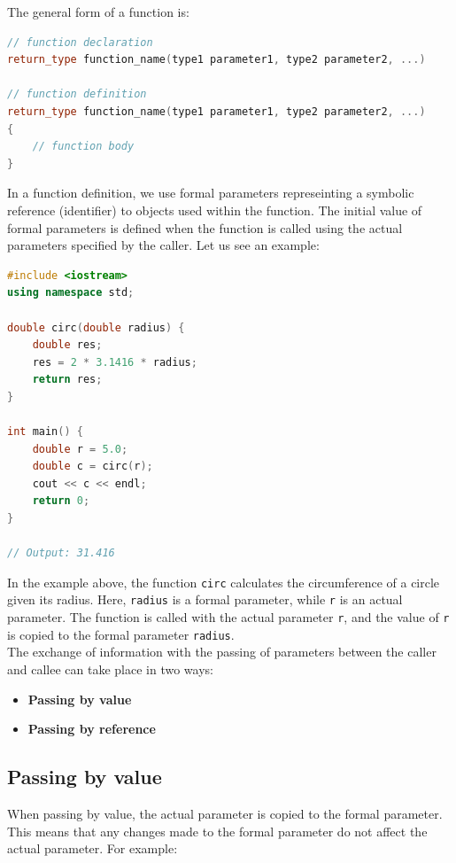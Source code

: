 The general form of a function is:

\begin{lstlisting}[language=C++]
// function declaration
return_type function_name(type1 parameter1, type2 parameter2, ...)

// function definition
return_type function_name(type1 parameter1, type2 parameter2, ...)
{
    // function body
}
\end{lstlisting}

In a function definition, we use formal parameters represeinting a symbolic
reference (identifier) to objects used within the function. The initial value of
formal parameters is defined when the function is called using the actual 
parameters specified by the caller. Let us see an example:\\

\begin{lstlisting}[language=C++]
#include <iostream>
using namespace std;

double circ(double radius) {
    double res;
    res = 2 * 3.1416 * radius;
    return res;
}

int main() {
    double r = 5.0;
    double c = circ(r);
    cout << c << endl;
    return 0;
}

// Output: 31.416
\end{lstlisting}

In the example above, the function \texttt{circ} calculates the circumference of
a circle given its radius. Here, \texttt{radius} is a formal parameter, while
\texttt{r} is an actual parameter. The function is called with the actual
parameter \texttt{r}, and the value of \texttt{r} is copied to the formal
parameter \texttt{radius}.\\

The exchange of information with the passing of parameters between the caller and callee
can take place in two ways:

\begin{itemize}
    \item \textbf{Passing by value}
    \item \textbf{Passing by reference}
\end{itemize}

\subsection{Passing by value}

When passing by value, the actual parameter is copied to the formal parameter.
This means that any changes made to the formal parameter do not affect the 
actual parameter. For example:\\


